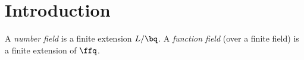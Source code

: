 \chapter{Introduction}

A \textit{number field} is a finite extension $L/\bq$. A \textit{function field} (over a finite field) is a finite extension of $\ffq$.
